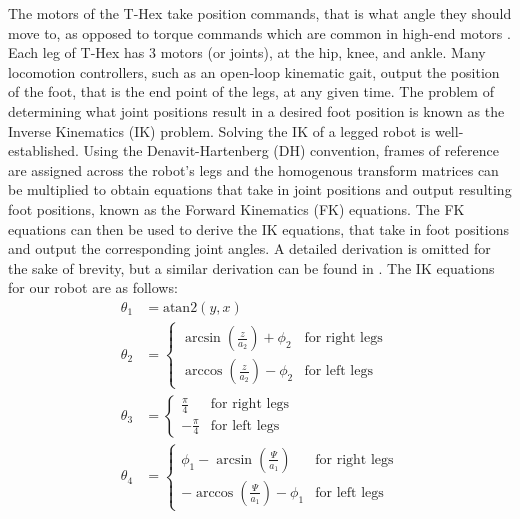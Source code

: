The motors of the T-Hex take position commands, that is what angle they should move to, as opposed to torque commands which are common in high-end motors \cite{bledtMITCheetah32018, hutterANYmalHighlyMobile2016}. Each leg of T-Hex has 3 motors (or joints), at the hip, knee, and ankle. Many locomotion controllers, such as an open-loop kinematic gait, output the position of the foot, that is the end point of the legs, at any given time. The problem of determining what joint positions result in a desired foot position is known as the Inverse Kinematics (IK) problem. Solving the IK of a legged robot is well-established. Using the Denavit-Hartenberg (DH) convention, frames of reference are assigned across the robot's legs and the homogenous transform matrices can be multiplied to obtain equations that take in joint positions and output resulting foot positions, known as the Forward Kinematics (FK) equations. The FK equations can then be used to derive the IK equations, that take in foot positions and output the corresponding joint angles. A detailed derivation is omitted for the sake of brevity, but a similar derivation can be found in \cite{sunHexapodRobotKinematics2017}. The IK equations for our robot are as follows:
\begin{align}
    \theta_1 &= \text{atan2}(y, x) \\
    \theta_2 &= 
    \begin{cases} 
        \arcsin\left(\frac{z}{a_2}\right) + \phi_2 & \text{for right legs} \\
        \arccos\left(\frac{z}{a_2}\right) - \phi_2 & \text{for left legs}
    \end{cases} \\
    \theta_3 &= 
    \begin{cases} 
        \frac{\pi}{4} & \text{for right legs} \\
        -\frac{\pi}{4} & \text{for left legs}
    \end{cases} \\
    \theta_4 &= 
    \begin{cases} 
        \phi_1 - \arcsin\left(\frac{\Psi}{a_1}\right) & \text{for right legs} \\
        -\arccos\left(\frac{\Psi}{a_1}\right) - \phi_1 & \text{for left legs}
    \end{cases} 
\end{align}

